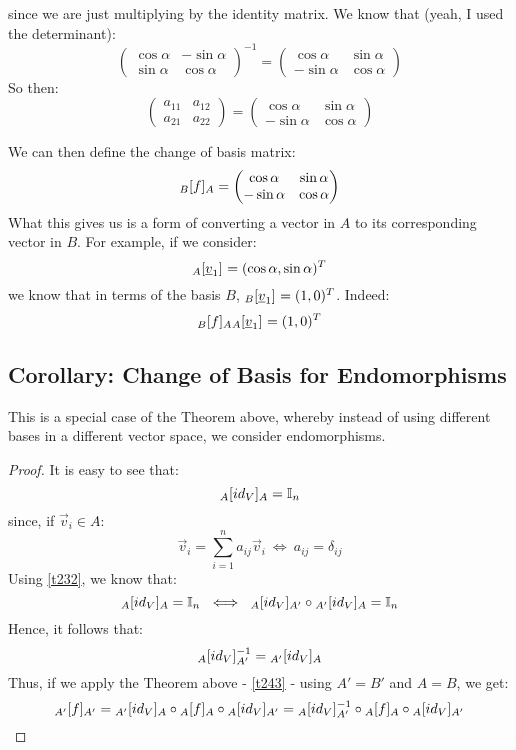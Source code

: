\documentclass{exam}
\begin{document}
since we are just multiplying by the identity matrix.
We know that (yeah, I used the determinant):
\[
\begin{pmatrix}
\cos \alpha & -\sin \alpha \\
\sin \alpha & \cos \alpha
\end{pmatrix}^{-1}
=
\begin{pmatrix}
\cos \alpha & \sin \alpha \\
-\sin \alpha & \cos \alpha
\end{pmatrix}
\]
So then:
\[
\begin{pmatrix}
a_{11} & a_{12} \\
a_{21} & a_{22}
\end{pmatrix}
= 
\begin{pmatrix}
\cos \alpha & \sin \alpha \\
-\sin \alpha & \cos \alpha
\end{pmatrix}
\]

We can then define the change of basis matrix:
\[
\cript{f}{B}{A} = \begin{pmatrix}
\cos \alpha & \sin \alpha \\
-\sin \alpha & \cos \alpha
\end{pmatrix}
\]
What this gives us is a form of converting a vector in $A$ to its corresponding vector in $B$. For example, if we consider:
\[
\cript{\vec{v}_1}{A}{} = (\cos\alpha, \sin\alpha)^T
\]
we know that in terms of the basis $B$, $\cript{\vec{v}_1}{B}{} = (1,0)^T$. Indeed:
\[
\cript{f}{B}{A} \cript{\vec{v}_1}{A}{} = (1,0)^T
\]

\subsection{Corollary: Change of Basis for Endomorphisms}

This is a special case of the Theorem above, whereby instead of using different bases in a different vector space, we consider endomorphisms.


\begin{proof}

It is easy to see that:
\[
\cript{id_V}{A}{A} = \mathbb{I}_n
\]
since, if $\vec{v}_i \in A$:
\[
\vec{v}_i = \sum_{i = 1}^n a_{ij}\vec{v}_i \ \iff \ a_{ij} = \delta_{ij}
\]
Using \eqref{t232}, we know that:
\[
\cript{id_V}{A}{A} = \mathbb{I}_n \ \iff \ \cript{id_V}{A}{A'} \circ \cript{id_V}{A'}{A} = \mathbb{I}_n
\]
Hence, it follows that:
\[
\cript{id_V}{A}{A'}^{-1} = \cript{id_V}{A'}{A}
\]
Thus, if we apply the Theorem above - \eqref{t243} - using $A' = B'$ and $A = B$, we get:    
\[
\cript{f}{A'}{A'} = \cript{id_V}{A'}{A} \circ \cript{f}{A}{A} \circ \cript{id_V}{A}{A'} = \cript{id_V}{A}{A'}^{-1} \circ \cript{f}{A}{A} \circ \cript{id_V}{A}{A'}
\]

\end{proof}
\end{document}
